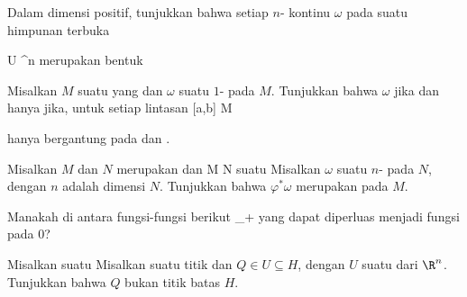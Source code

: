 {}
{

Dalam dimensi positif, tunjukkan bahwa setiap
$n$-
kontinu $\omega$ pada suatu himpunan terbuka

\mavergleichskette
{\vergleichskette
{U
}
{ \subseteq }{\R^n
}
{  }{
}
{    }{
}
{   }{
}
}
{}{}{}
merupakan bentuk

}
{} {}

{}
{

Misalkan $M$ suatu
yang
dan $\omega$ suatu
$1$-
pada $M$. Tunjukkan bahwa $\omega$
jika dan hanya jika, untuk setiap lintasan
\maabbdisp {\gamma} { [a,b] } { M
} {}

\mathl{\int_\gamma \omega}{} hanya bergantung pada
 dan
.

}
{} {}

{}
{

Misalkan $M$ dan $N$ merupakan
dan
\maabbdisp {\varphi} { M } { N
} {}
suatu
Misalkan $\omega$ suatu
$n$-
pada $N$, dengan $n$ adalah dimensi $N$. Tunjukkan bahwa $\varphi^* \omega$ merupakan
pada $M$.

}
{} {}

{}
{

Manakah di antara fungsi-fungsi berikut
\maabbdisp {} {\R_+} {\R
} {}
yang dapat diperluas menjadi fungsi
pada
$0$?

}
{} {}

{}
{

Misalkan
 suatu
Misalkan
 suatu titik dan $Q \in U \subseteq H$, dengan $U$ suatu
dari $\R^n$. Tunjukkan bahwa $Q$ bukan titik batas $H$.

}
{} {}

